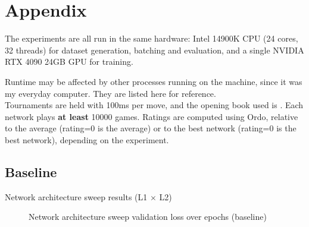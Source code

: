 \appendix

\section{Appendix}

The experiments are all run in the same hardware: Intel 14900K CPU (24 cores, 32 threads) for dataset generation, batching and evaluation, and a single NVIDIA RTX 4090 24GB GPU for training.

Runtime may be affected by other processes running on the machine, since it was my everyday computer. They are listed here for reference. \\

Tournaments are held with 100ms per move, and the opening book used is . Each network plays \textbf{at least} 10000 games. Ratings are computed using Ordo, relative to the average (rating=0 is the average) or to the best network (rating=0 is the best network), depending on the experiment. \\

\subsection{Baseline}
\label{appendix:baseline}

\begin{table}[H]
\caption{Network architecture sweep results (L1 $\times$ L2)}
\centering
\begin{adjustbox}{center}

\end{adjustbox}
\end{table}

\begin{figure}[H]
\centering
{}
\caption{Network architecture sweep validation loss over epochs (baseline)}
\end{figure}

